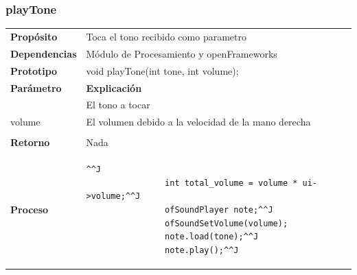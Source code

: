 \documentclass[a4paper,12pt]{article}
\begin{document}
\subsubsection{playTone}
\begin{tabularx}{\textwidth}{p{25mm} X}
        \textbf{Propósito} & Toca el tono recibido como parametro \\
        \textbf{Dependencias} & Módulo de Procesamiento y openFrameworks\\
        \textbf{Prototipo} & void playTone(int tone, int volume);\\
        \textbf{Parámetro} & \textbf{Explicación} \\
        \begin{tabular}{p{2cm} l}
                tone & El tono a tocar \\
                volume & El volumen debido a la velocidad de la mano derecha\\
        \end{tabular}\\
        \textbf{Retorno} & Nada \\
        \textbf{Proceso} & 
        \begin{lstlisting}[breaklines=true]^^J
                int total_volume = volume * ui->volume;^^J
                ofSoundPlayer note;^^J
                ofSoundSetVolume(volume);
                note.load(tone);^^J
                note.play();^^J
        \end{lstlisting}

        \\
\end{tabularx}

\newpage
\end{document}
